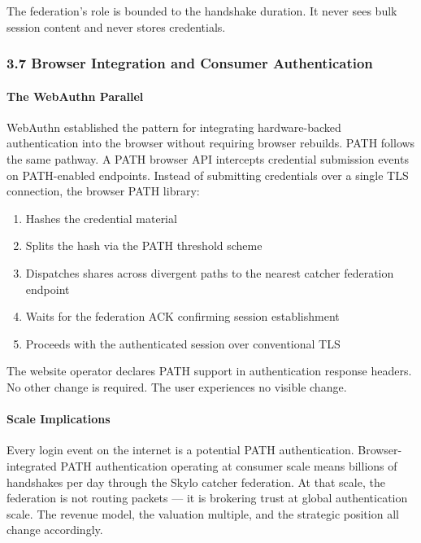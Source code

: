 \documentclass[
  11pt,
]{article}
\providecommand{\tightlist}{%
  \setlength{\itemsep}{0pt}\setlength{\parskip}{0pt}}
\begin{document}
The federation's role is bounded to the handshake duration. It never
sees bulk session content and never stores credentials.

\hypertarget{browser-integration-and-consumer-authentication}{%
\subsubsection{3.7 Browser Integration and Consumer
Authentication}\label{browser-integration-and-consumer-authentication}}

\hypertarget{the-webauthn-parallel}{%
\paragraph{The WebAuthn Parallel}\label{the-webauthn-parallel}}

WebAuthn established the pattern for integrating hardware-backed
authentication into the browser without requiring browser rebuilds. PATH
follows the same pathway. A PATH browser API intercepts credential
submission events on PATH-enabled endpoints. Instead of submitting
credentials over a single TLS connection, the browser PATH library:

\begin{enumerate}
\def\labelenumi{\arabic{enumi}.}
\tightlist
\item
  Hashes the credential material
\item
  Splits the hash via the PATH threshold scheme
\item
  Dispatches shares across divergent paths to the nearest catcher
  federation endpoint
\item
  Waits for the federation ACK confirming session establishment
\item
  Proceeds with the authenticated session over conventional TLS
\end{enumerate}

The website operator declares PATH support in authentication response
headers. No other change is required. The user experiences no visible
change.

\hypertarget{scale-implications}{%
\paragraph{Scale Implications}\label{scale-implications}}

Every login event on the internet is a potential PATH authentication.
Browser-integrated PATH authentication operating at consumer scale means
billions of handshakes per day through the Skylo catcher federation. At
that scale, the federation is not routing packets --- it is brokering
trust at global authentication scale. The revenue model, the valuation
multiple, and the strategic position all change accordingly.
\end{document}
